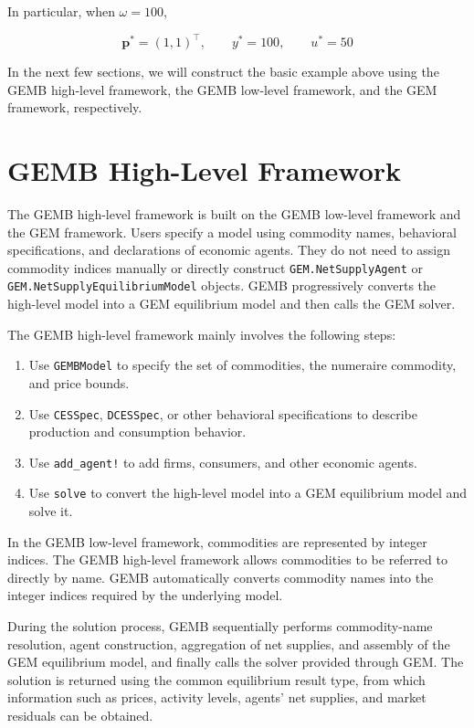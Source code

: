 \documentclass[
  letterpaper,
  DIV=11,
  numbers=noendperiod]{scrreprt}
\begin{document}
In particular, when \(\omega=100\),

\[
\mathbf p^*=(1,1)^\top,\qquad
y^*=100,\qquad
u^*=50
\]

In the next few sections, we will construct the basic example above
using the GEMB high-level framework, the GEMB low-level framework, and
the GEM framework, respectively.

\section{GEMB High-Level Framework}\label{gemb-high-level-framework}

The GEMB high-level framework is built on the GEMB low-level framework
and the GEM framework. Users specify a model using commodity names,
behavioral specifications, and declarations of economic agents. They do
not need to assign commodity indices manually or directly construct
\texttt{GEM.NetSupplyAgent} or \texttt{GEM.NetSupplyEquilibriumModel}
objects. GEMB progressively converts the high-level model into a GEM
equilibrium model and then calls the GEM solver.

The GEMB high-level framework mainly involves the following steps:

\begin{enumerate}
\def\labelenumi{\arabic{enumi}.}
\item
  Use \texttt{GEMBModel} to specify the set of commodities, the
  numeraire commodity, and price bounds.
\item
  Use \texttt{CESSpec}, \texttt{DCESSpec}, or other behavioral
  specifications to describe production and consumption behavior.
\item
  Use \texttt{add\_agent!} to add firms, consumers, and other economic
  agents.
\item
  Use \texttt{solve} to convert the high-level model into a GEM
  equilibrium model and solve it.
\end{enumerate}

In the GEMB low-level framework, commodities are represented by integer
indices. The GEMB high-level framework allows commodities to be referred
to directly by name. GEMB automatically converts commodity names into
the integer indices required by the underlying model.

During the solution process, GEMB sequentially performs commodity-name
resolution, agent construction, aggregation of net supplies, and
assembly of the GEM equilibrium model, and finally calls the solver
provided through GEM. The solution is returned using the common
equilibrium result type, from which information such as prices, activity
levels, agents' net supplies, and market residuals can be obtained.
\end{document}

